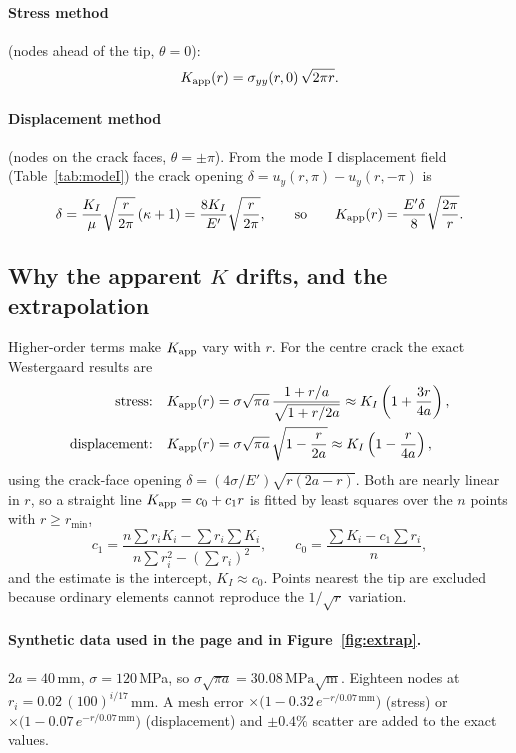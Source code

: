 \documentclass[11pt,a4paper]{article}
\newcommand{\MPam}{\,\mathrm{MPa}\sqrt{\mathrm{m}}}
\begin{document}
\paragraph{Stress method} (nodes ahead of the tip, $\theta=0$):
\begin{equation}
  K_{\rm app}(r) = \sigma_{yy}(r,0)\,\sqrt{2\pi r}.
\end{equation}

\paragraph{Displacement method} (nodes on the crack faces, $\theta=\pm\pi$). From the mode I
displacement field (Table~\ref{tab:modeI}) the crack opening $\delta=u_y(r,\pi)-u_y(r,-\pi)$ is
\begin{equation}
  \delta = \frac{K_I}{\mu}\sqrt{\frac{r}{2\pi}}\,(\kappa+1) = \frac{8K_I}{E'}\sqrt{\frac{r}{2\pi}},
  \qquad\text{so}\qquad
  K_{\rm app}(r) = \frac{E'\delta}{8}\sqrt{\frac{2\pi}{r}}.
\end{equation}

\subsection{Why the apparent $K$ drifts, and the extrapolation}
Higher-order terms make $K_{\rm app}$ vary with $r$. For the centre crack the exact Westergaard
results are
\begin{align}
  \text{stress:}\quad K_{\rm app}(r) &= \sigma\sqrt{\pi a}\,\frac{1+r/a}{\sqrt{1+r/2a}} \approx K_I\left(1+\frac{3r}{4a}\right),\\
  \text{displacement:}\quad K_{\rm app}(r) &= \sigma\sqrt{\pi a}\,\sqrt{1-\frac{r}{2a}} \approx K_I\left(1-\frac{r}{4a}\right),
\end{align}
using the crack-face opening $\delta = (4\sigma/E')\sqrt{r(2a-r)}$. Both are nearly linear in $r$, so a
straight line $K_{\rm app}=c_0+c_1r$ is fitted by least squares over the $n$ points with $r\ge r_{\min}$,
\begin{equation}
  c_1 = \frac{n\sum r_iK_i - \sum r_i\sum K_i}{n\sum r_i^2-\left(\sum r_i\right)^2},\qquad
  c_0 = \frac{\sum K_i - c_1\sum r_i}{n},
\end{equation}
and the estimate is the intercept, $K_I\approx c_0$. Points nearest the tip are excluded because
ordinary elements cannot reproduce the $1/\sqrt r$ variation.

\paragraph{Synthetic data used in the page and in Figure~\ref{fig:extrap}.}
$2a=40$\,mm, $\sigma=120$\,MPa, so $\sigma\sqrt{\pi a}=30.08\MPam$. Eighteen nodes at
$r_i = 0.02\,(100)^{i/17}$\,mm. A mesh error $\times\bigl(1-0.32\,e^{-r/0.07\,\mathrm{mm}}\bigr)$
(stress) or $\times\bigl(1-0.07\,e^{-r/0.07\,\mathrm{mm}}\bigr)$ (displacement) and $\pm0.4\%$ scatter
are added to the exact values.
\end{document}
